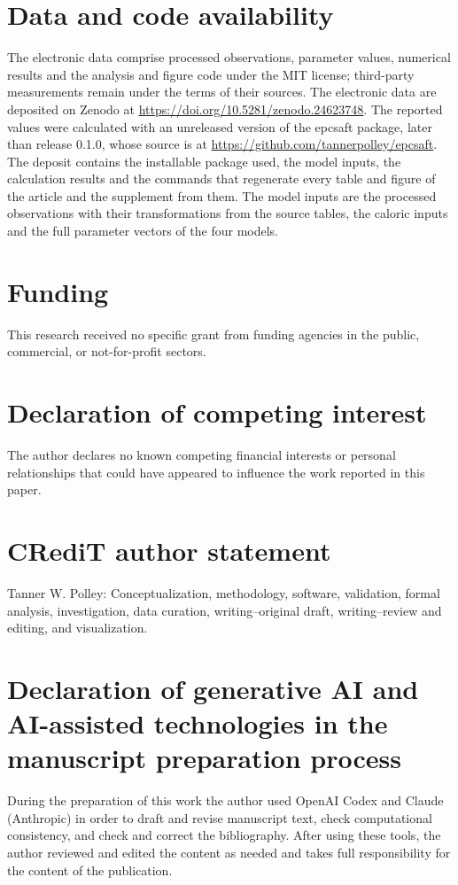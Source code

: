\section*{Data and code availability}
The electronic data comprise processed observations, parameter values, numerical results and the analysis and figure code under the MIT license; third-party measurements remain under the terms of their sources.
The electronic data are deposited on Zenodo at \url{https://doi.org/10.5281/zenodo.24623748}.
The reported values were calculated with an unreleased version of the epcsaft package, later than release 0.1.0, whose source is at \url{https://github.com/tannerpolley/epcsaft}.
The deposit contains the installable package used, the model inputs, the calculation results and the commands that regenerate every table and figure of the article and the supplement from them.
The model inputs are the processed observations with their transformations from the source tables, the caloric inputs and the full parameter vectors of the four models.

\section*{Funding}
This research received no specific grant from funding agencies in the public, commercial, or not-for-profit sectors.

\section*{Declaration of competing interest}
The author declares no known competing financial interests or personal relationships that could have appeared to influence the work reported in this paper.

\section*{CRediT author statement}
Tanner W. Polley: Conceptualization, methodology, software, validation, formal analysis, investigation, data curation, writing--original draft, writing--review and editing, and visualization.

\section*{Declaration of generative AI and AI-assisted technologies in the manuscript preparation process}
During the preparation of this work the author used OpenAI Codex and Claude (Anthropic) in order to draft and revise manuscript text, check computational consistency, and check and correct the bibliography.
After using these tools, the author reviewed and edited the content as needed and takes full responsibility for the content of the publication.
